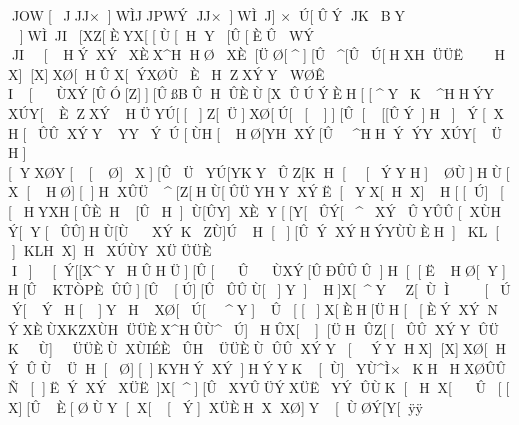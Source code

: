 \documentclass[11pt]{article}
\begin{document}
JOW[JJJ×]WÌJJPWÝ
JJ×]WÌJ]
×\\Ú[ÛÝ
JKBY	]WÌJI[XZ[ÈYX[[Ù[HY\[ÛH\ÈY\ÛÛ][Û[ÈÛ	WÝ
JI[HÝXÝ\[Y]XÈX^HHØ\\[ÈÙ[ÛY]XÈ[ÜØ[^][Û^[ÛÚ[\H\XHÜÜË\È\ÈHX][X]XØ[HÛX[\ÝXØÙÈHZXÝY	WØÊ
I[ÙXÝ[ÛÓ[Z]][ÛßBÛHÛÈÙ\[X\Û\ÚÝÈ\H[[^Y\K^H\HÝYXÚY[ÈZXÝHÜYÚ[[\\]Z[Ü]XØ[\Ú[[\]][Û[[[ÛÝ]H]Ý[\XH[ÛÛXÝYYYÝÚ[ÙH[HØ[YH\XÝ[Û^H\HÝÝYXÚY[ÜH][YXØY[[Ø]\Ø[]X][ÛÜYÚ[YK\ÚYÛZ[KH[[ÝYH]\ÝØÙ]\HÙ\[X\[HØ][]HXÛÜ^[Z[HÙ[ÛÜY\HYXÝË[YX[H\X]H[[\Ú\ÈÚ][[\[[ÒPÈÙXÝHÝ\[YÙKY[Ú]HYX\Ý\H[ÛÈ\Ù\ÈH\Ý\[ZYÚÜ\Þ[X][ÛH]\Ù[ÛY]XÈY[[Y[ÛÝ[^XÝÛYÛÛ[XÙHÝ[\Y\È[ÛÛ\]HÙ[Ù\[Y]\\XÝKZÙ]ÚH[][ÛÝXÝ\HÝYÙÙ\ÝÈH]\[^[Ú[ÛÈ\Ú\Ý[Û[ÛÙÞK[ÚXÚ]KL[]KLHX]\\È\HXÚÙYXÜÜÜÈ	I]\[Ý[[X\^YHÛHÜ\][Û[\ÚÛÙXÝ[ÛÐÛÛÛ\Ú[ÛBH[Ú\[\Ý[\ÈH\ØÚ\[YYØ]]H[[ËHØ[Y]H[ÛKTÒPÈ\ÛÛ][Û[Ú][Û\ÈÛÛÙ[]Y]H]X[^Y\\Z[ÙÌ[ÚÝ[ÝH[\]Y\ÈHXØ[Ú[^Y]\ÚÛ[[\Ú\È]X[ÈH[ÜH[\\Ý[ÈÝXÝ\[ÜÜÚX[]N\ÝXÈÙXKZXÙHÜÜÈX^HÛÙ^\ÝÚ]HÛX[\][ÜHÛZ[[ÛÛXÝYÛÜK\ÈÙ\\]\ÈÜÜÈÙXÙIÉÈÛHÜÜÈÙÛÛXÝY[ÝY\ÈHX][X]XØ[HÝÛÙ\\Ú\ÈÜH[Ø][]KY\HÝXÝ\[XÛÛXÝ]]HÝYK[\Ù]\ÜYÙ^Ì×\Ù[[\ÚÚ\B\YÜ\Ô\ÙXÚX[]KHHXØÛÛ\[Z[ÈÚXÝXÚØYÙH[ÛY\ÈHÛÈ]Ñ[]ËÝXÝ\[Y]XÜË]X[^][ÛXYÛÜÝXÜËYÝ\\ËÛÙK[HX[\ÚÛ\[[X][ÛÈ[ØÙ\Y[X[[Ý]\ÝXÜÈ\HXXØ]Y[ÙØÝ[Y[ÿÿ
\end{document}
